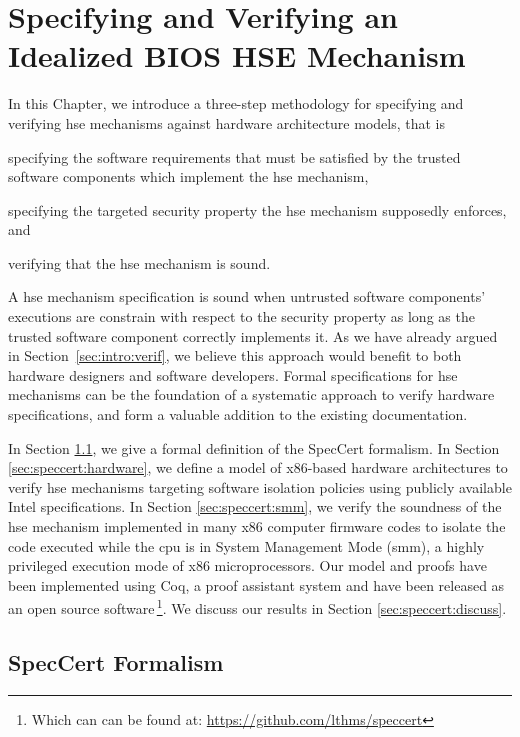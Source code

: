 \chapter{Specifying and Verifying an Idealized BIOS HSE Mechanism}

\newpage

In this Chapter, we introduce a three-step methodology for specifying and
verifying \ac{hse} mechanisms against hardware architecture models, that is
%
\begin{inparaenum}[(1)]
\item specifying the software requirements that must be satisfied by the trusted
  software components which implement the \ac{hse} mechanism,
%
\item specifying the targeted security property the \ac{hse} mechanism
  supposedly enforces, and
%
\item verifying that the \ac{hse} mechanism is sound.
\end{inparaenum}
%
A \ac{hse} mechanism specification is sound when untrusted software components'
executions are constrain with respect to the security property as long as the
trusted software component correctly implements it.
%
As we have already argued in Section~\ref{sec:intro:verif}, we believe this
approach would benefit to both hardware designers and software developers.
%
Formal specifications for \ac{hse} mechanisms can be the foundation of a
systematic approach to verify hardware specifications, and form a valuable
addition to the existing documentation.

In Section \ref{sec:speccert:framework}, we give a formal definition of the
SpecCert formalism.
%
In Section \ref{sec:speccert:hardware}, we define a model of x86-based hardware
architectures to verify \ac{hse} mechanisms targeting software isolation
policies using publicly available Intel specifications.
%
In Section \ref{sec:speccert:smm}, we verify the soundness of the \ac{hse}
mechanism implemented in many x86 computer firmware codes to isolate the code
executed while the \ac{cpu} is in System Management Mode (\ac{smm}), a highly
privileged execution mode of x86 microprocessors.
%
Our model and proofs have been implemented using Coq, a proof assistant system
and have been released as an open source software\,\footnote{Which can can be
  found at: \url{https://github.com/lthms/speccert}}.
%
We discuss our results in Section \ref{sec:speccert:discuss}.

\section{SpecCert Formalism} \label{sec:speccert:framework}

